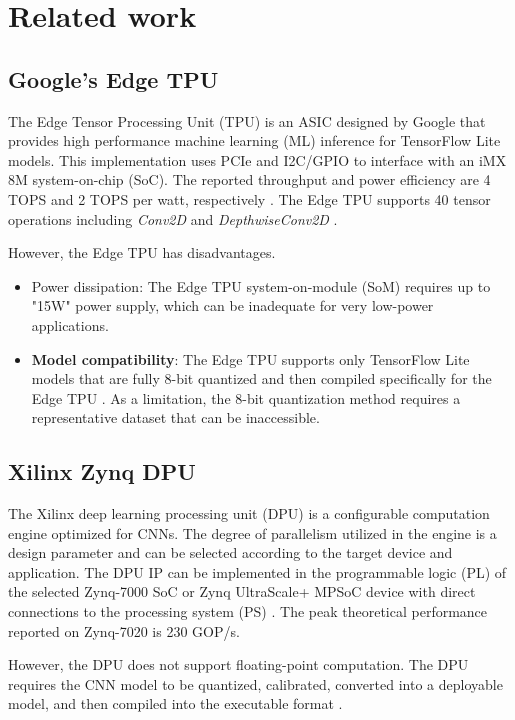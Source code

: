 \section{Related work}
\label{sec:related_work}
\subsection{Google's Edge TPU}

The Edge Tensor Processing Unit (TPU) is an ASIC designed by Google that provides high performance machine learning (ML) inference for TensorFlow Lite models\cite{yazdanbakhsh2021evaluation}. This implementation uses PCIe and I2C/GPIO to interface with an iMX 8M system-on-chip (SoC). The reported throughput and power efficiency are 4 TOPS and 2 TOPS per watt, respectively \cite{coral2021Datasheet}. The Edge TPU supports 40 tensor operations including \emph{Conv2D} and \emph{DepthwiseConv2D} \cite{coral2021Compatibility}.

However, the Edge TPU has disadvantages.
\begin{itemize}
	\item Power dissipation: The Edge TPU system-on-module (SoM) requires up to "15W" power supply\cite{coral2021Datasheet}, which can be inadequate for very low-power applications.
	\item \textbf{Model compatibility}: The Edge TPU supports only TensorFlow Lite models that are fully 8-bit quantized and then compiled specifically for the Edge TPU \cite{cass2019taking}. As a limitation, the 8-bit quantization method requires a representative dataset that can be inaccessible.
\end{itemize}

\subsection{Xilinx Zynq DPU}
The Xilinx deep learning processing unit (DPU) is a configurable computation engine optimized for CNNs. The degree of parallelism utilized in the engine is a design parameter and can be selected according to the target device and application. The DPU IP can be implemented in the programmable logic (PL) of the selected Zynq-7000 SoC or Zynq UltraScale+ MPSoC device with direct connections to the processing system (PS) \cite{xilinxDPU}. The peak theoretical performance reported on Zynq-7020 is 230 GOP/s.

However, the DPU does not support floating-point computation. The DPU requires the CNN model to be quantized, calibrated, converted into a deployable model, and then compiled into the executable format \cite{xilinxDPU}.